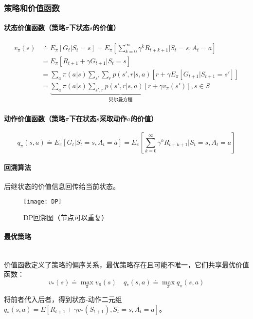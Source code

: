 \documentclass[
12pt, %
a4paper, 
oneside, %
headinclude,footinclude, %
]{scrartcl}
\begin{document}
\subsubsection{策略和价值函数}
\paragraph{状态价值函数（策略$ \pi $下状态$ s $的价值）}
\begin{align*}
v_\pi(s) 
&\doteq E_\pi[G_t|S_t = s] = E_\pi[\sum_{k = 0}^{\infty} \gamma^k R_{t + k + 1}|S_t = s, A_t = a]\\
&= E_\pi[R_{t + 1} + \gamma G_{t+1}|S_t = s] \\
&= \sum_a \pi(a|s) \sum_{s'} \sum_r p(s', r|s, a)[r + \gamma E_\pi[G_{t + 1}|S_{t + 1} = s']] \\
&= \underbrace{\sum_a \pi(a|s) \sum_{s', r} p(s', r|s, a)[r + \gamma v_\pi(s')]}_{贝尔曼方程}, s \in S
\end{align*}
\paragraph{动作价值函数（策略$ \pi $下在状态$ s $采取动作$ a $的价值）}
$$ q_\pi(s, a) \doteq E_\pi[G_t|S_t = s, A_t = a] = E_\pi[\sum_{k = 0}^{\infty} \gamma^k R_{t + k + 1}|S_t = s, A_t = a] $$
\paragraph{回溯算法}
后继状态的价值信息回传给当前状态。

\begin{figure}[H]
\centering 
\texttt{[image: DP]} 
\caption[DP回溯图]{DP回溯图（节点可以重复）}
\end{figure}
\paragraph{最优策略}~\\

价值函数定义了策略的偏序关系，最优策略存在且可能不唯一，它们共享最优价值函数：
$$ v_*(s) \doteq \max_{\pi} v_{\pi}(s) \quad q_*(s, a) \doteq \max_{\pi} q_{\pi}(s, a) $$

将前者代入后者，得到状态-动作二元组$ q_*(s, a) = E[R_{t + 1} + \gamma v_*(S_{t + 1}), S_t = s, A_t = a] $。
\end{document}
